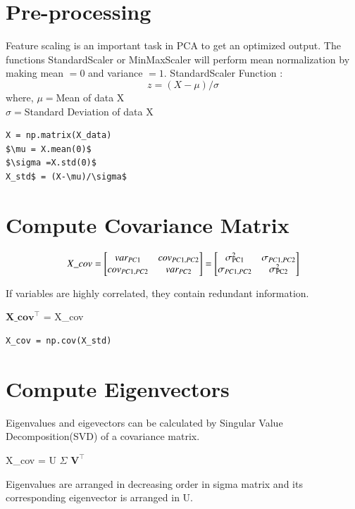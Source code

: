 \documentclass[journal,12pt,twocolumn]{IEEEtran}
\def\SPSB#1#2{\rlap{\textsuperscript{\textcolor{black}{#1}}}\SB{#2}}
\def\SB#1{\textsubscript{\textcolor{black}{#1}}}
\begin{document}
\section{Pre-processing}
Feature scaling is an important task in PCA to get an optimized output. The functions  StandardScaler or MinMaxScaler will perform mean normalization by making mean $=0$ and variance $=1$.
StandardScaler Function : 
$$ z = (X-\mu)/\sigma$$
where, $\mu = $Mean of data X\\
$\sigma =$Standard Deviation of data X\\

\begin{lstlisting}[mathescape=true]
X = np.matrix(X_data)
$\mu = X.mean(0)$
$\sigma =X.std(0)$
X_std$ = (X-\mu)/\sigma$
\end{lstlisting}


\section{Compute Covariance Matrix}
\[
   X\_cov=
  \begin{bmatrix}
   var_{PC1} & cov_{PC1,PC2} \\
   cov_{PC1,PC2} & var_{PC2} \\
  \end{bmatrix} = 
  \begin{bmatrix}
   \sigma\SPSB{2}{PC1} & \sigma_{PC1,PC2} \\
   \sigma_{PC1,PC2} & \sigma\SPSB{2}{PC2} \\
  \end{bmatrix} 
  \]

If variables are highly correlated, they contain redundant information.
\begin{center} $\mathbf{X\_cov}^\intercal$ = X\_cov \end{center} 
 
\begin{lstlisting}[mathescape=true]
X_cov = np.cov(X_std)
\end{lstlisting}

\section{Compute Eigenvectors}
Eigenvalues and eigevectors can be calculated by Singular Value Decomposition(SVD) of a covariance matrix. 
\begin{center} X\_cov = U $\Sigma$ $\mathbf{V}^\intercal$ \end{center}Eigenvalues are arranged in decreasing order in sigma matrix and its corresponding eigenvector is arranged in U.
\end{document}
